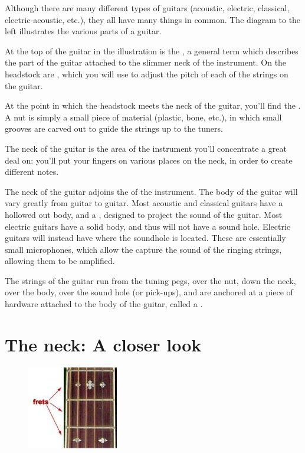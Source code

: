 Although there are many different types of guitars (acoustic, electric,
classical, electric-acoustic, etc.), they all have many things in common. The
diagram to the left illustrates the various parts of a guitar.

At the top of the guitar in the illustration is the , a general term
which describes the part of the guitar attached to the slimmer neck of the
instrument. On the headstock are , which you will use to adjust the
pitch of each of the strings on the guitar.

At the point in which the headstock meets the neck of the guitar, you'll find
the . A nut is simply a small piece of material (plastic, bone, etc.), in
which small grooves are carved out to guide the strings up to the tuners.

The neck of the guitar is the area of the instrument you'll concentrate a great
deal on: you'll put your fingers on various places on the neck, in order to
create different notes.

The neck of the guitar adjoins the  of the instrument. The body of the
guitar will vary greatly from guitar to guitar. Most acoustic and classical
guitars have a hollowed out body, and a , designed to project the
sound of the guitar. Most electric guitars have a solid body, and thus will not
have a sound hole. Electric guitars will instead have  where the
soundhole is located. These  are essentially small microphones, which
allow the capture the sound of the ringing strings, allowing them to be
amplified.

The strings of the guitar run from the tuning pegs, over the nut, down the
neck, over the body, over the sound hole (or pick-ups), and are anchored at a
piece of hardware attached to the body of the guitar, called a . 

\section{The neck: A closer look}
\begin{figure}
\includegraphics{partone/frets.jpg}
\end{figure}

